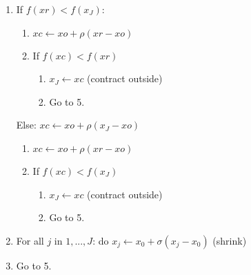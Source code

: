 \documentclass[12pt]{article}
\begin{document}
\begin{enumerate}
	\item If $f(xr) < f(x_J)$:
		\begin{enumerate}
			\item $xc \leftarrow xo  + \rho (xr - xo) $
			\item If $f(xc) < f(xr)$
				\begin{enumerate}
					\item $x_{J} \leftarrow xc $ \hspace*{5pt} (contract outside)
					\item Go to 5.
				\end{enumerate}
		\end{enumerate}
		Else:
		$xc \leftarrow xo  + \rho (x_{J} - xo) $
		\begin{enumerate}
			\item $xc \leftarrow xo  + \rho (xr - xo) $
			\item If $f(xc) < f(x_J)$
				\begin{enumerate}
					\item $x_{J} \leftarrow xc $ \hspace*{5pt} (contract outside)
					\item Go to 5.
				\end{enumerate}
		\end{enumerate}
	
	\item For all $j$ in $1, ..., J$: do $x_j \leftarrow x_0 + \sigma(x_j - x_0)$ \hspace*{5pt} (shrink)
	\item Go to 5.	
\end{enumerate}
\end{document}
